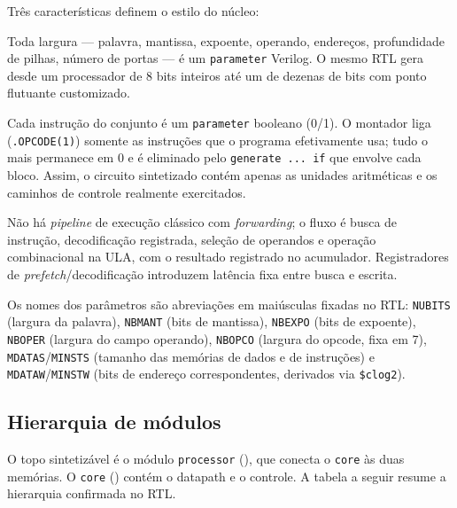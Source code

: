 Três características definem o estilo do núcleo:

\begin{description}[leftmargin=2.2em]
  \item[Totalmente parametrizável] Toda largura --- palavra, mantissa, expoente, operando,
    endereços, profundidade de pilhas, número de portas --- é um \lstinline|parameter|
    Verilog. O mesmo RTL gera desde um processador de 8 bits inteiros até um de dezenas de
    bits com ponto flutuante customizado.
  \item[Pague apenas pelo que usar] Cada instrução do conjunto é um \lstinline|parameter|
    booleano (0/1). O montador liga (\lstinline|.OPCODE(1)|) somente as instruções que o
    programa efetivamente usa; tudo o mais permanece em 0 e é eliminado pelo
    \lstinline|generate ... if| que envolve cada bloco. Assim, o circuito sintetizado contém
    apenas as unidades aritméticas e os caminhos de controle realmente exercitados.
  \item[Datapath de ciclo curto] Não há \emph{pipeline} de execução clássico com
    \emph{forwarding}; o fluxo é busca de instrução, decodificação registrada, seleção de
    operandos e operação combinacional na ULA, com o resultado registrado no acumulador.
    Registradores de \emph{prefetch}/decodificação introduzem latência fixa entre busca e
    escrita.
\end{description}

\begin{nota}
Os nomes dos parâmetros são abreviações em maiúsculas fixadas no RTL: \lstinline|NUBITS|
(largura da palavra), \lstinline|NBMANT| (bits de mantissa), \lstinline|NBEXPO| (bits de
expoente), \lstinline|NBOPER| (largura do campo operando), \lstinline|NBOPCO| (largura do
opcode, fixa em 7), \lstinline|MDATAS|/\lstinline|MINSTS| (tamanho das memórias de dados e
de instruções) e \lstinline|MDATAW|/\lstinline|MINSTW| (bits de endereço correspondentes,
derivados via \lstinline|$clog2|).
\end{nota}

\subsection{Hierarquia de módulos}
\label{sec:arq-hierarquia}

O topo sintetizável é o módulo \lstinline|processor| (), que conecta o
\lstinline|core| às duas memórias. O \lstinline|core| () contém o datapath e o
controle. A tabela a seguir resume a hierarquia confirmada no RTL.

